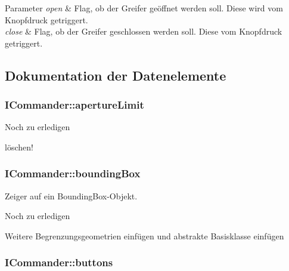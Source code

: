 \begin{DoxyParams}{Parameter}
{\em open} & Flag, ob der Greifer geöffnet werden soll. Diese wird vom Knopfdruck getriggert. \\
\hline
{\em close} & Flag, ob der Greifer geschlossen werden soll. Diese vom Knopfdruck getriggert. \\
\hline
\end{DoxyParams}


\subsection{Dokumentation der Datenelemente}
\hypertarget{classICommander_a01ec4010dc037bfb600cee7f0be9311c}{
\subsubsection[{aperture\-Limit}]{\setlength{\rightskip}{0pt plus 5cm}I\-Commander\-::aperture\-Limit\hspace{0.3cm}{\ttfamily [protected]}}}\label{classICommander_a01ec4010dc037bfb600cee7f0be9311c}
\begin{DoxyRefDesc}{Noch zu erledigen}
\item[\hyperlink{todo__todo000002}{Noch zu erledigen}]löschen! \end{DoxyRefDesc}
\hypertarget{classICommander_ab0d02021fcc73daaebcfe0a826e15f50}{
\subsubsection[{bounding\-Box}]{\setlength{\rightskip}{0pt plus 5cm}I\-Commander\-::bounding\-Box\hspace{0.3cm}{\ttfamily [protected]}}}\label{classICommander_ab0d02021fcc73daaebcfe0a826e15f50}


Zeiger auf ein Bounding\-Box-\/\-Objekt. 

\begin{DoxyRefDesc}{Noch zu erledigen}
\item[\hyperlink{todo__todo000006}{Noch zu erledigen}]Weitere Begrenzungsgeometrien einfügen und abstrakte Basisklasse einfügen \end{DoxyRefDesc}
\hypertarget{classICommander_a038f78434eb525d73414c84624d3c3e4}{
\subsubsection[{buttons}]{\setlength{\rightskip}{0pt plus 5cm}I\-Commander\-::buttons\hspace{0.3cm}{\ttfamily [protected]}}}\label{classICommander_a038f78434eb525d73414c84624d3c3e4}


